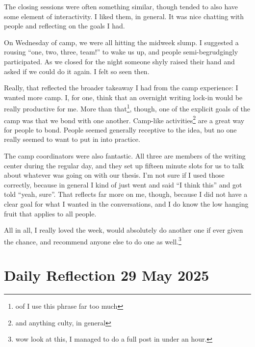 \documentclass[12pt]{article}
\newcommand{\say}[1]{``#1''}
\renewcommand{\,}{\textsuperscript{,}}
\begin{document}
The closing sessions were often something similar, though tended to also have some element of interactivity.  
I liked them, in general.  
It was nice chatting with people and reflecting on the goals I had.

On Wednesday of camp, we were all hitting the midweek slump.  
I suggested a rousing \say{one, two, three, team!} to wake us up, and people semi-begrudgingly participated.  
As we closed for the night someone shyly raised their hand and asked if we could do it again.  
I felt so seen then.

Really, that reflected the broader takeaway I had from the camp experience: I wanted more camp.  
I, for one, think that an overnight writing lock-in would be really productive for me.  
More than that\footnote{oof I use this phrase far too much}, though, one of the explicit goals of the camp was that we bond with one another.  
Camp-like activities\footnote{and anything culty, in general} are a great way for people to bond.  
People seemed generally receptive to the idea, but no one really seemed to want to put in into practice.

The camp coordinators were also fantastic.  
All three are members of the writing center during the regular day, and they set up fifteen minute slots for us to talk about whatever was going on with our thesis.  
I'm not sure if I used those correctly, because in general I kind of just went and said \say{I think this} and got told \say{yeah, sure}.  
That reflects far more on me, though, because I did not have a clear goal for what I wanted in the conversations, and I do know the low hanging fruit that applies to all people.

All in all, I really loved the week, would absolutely do another one if ever given the chance, and recommend anyone else to do one as well.\footnote{wow look at this, I managed to do a full post in under an hour.}

\section{Daily Reflection 29 May 2025}
\end{document}
